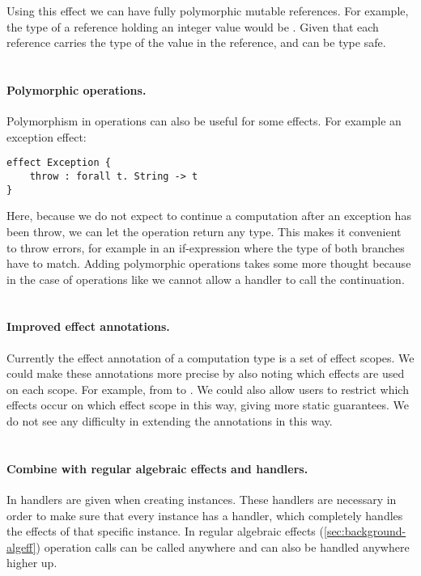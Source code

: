 Using this effect we can have fully polymorphic mutable references.
For example, the type of a reference holding an integer value would be .
Given that each reference carries the type of the value in the reference,  and  can be type safe.
\\\\
\paragraph{Polymorphic operations.}
Polymorphism in operations can also be useful for some effects.
For example an exception effect:
\begin{verbatim}
effect Exception {
	throw : forall t. String -> t
}
\end{verbatim}
Here, because we do not expect to continue a computation after an exception has been throw, we can let the  operation return any type.
This makes it convenient to throw errors, for example in an if-expression where the type of both branches have to match.
Adding polymorphic operations takes some more thought because in the case of operations like  we cannot allow a handler to call the continuation.
\\\\
\paragraph{Improved effect annotations.}
Currently the effect annotation of a computation type is a set of effect scopes.
We could make these annotations more precise by also noting which effects are used on each scope.
For example, from  to .
We could also allow users to restrict which effects occur on which effect scope in this way, giving more static guarantees.
We do not see any difficulty in extending the annotations in this way.
\\\\
\paragraph{Combine with regular algebraic effects and handlers.}
In \lang{} handlers are given when creating instances.
These handlers are necessary in order to make sure that every instance has a handler, which completely handles the effects of that specific instance.
In regular algebraic effects (\cref{sec:background-algeff}) operation calls can be called anywhere and can also be handled anywhere higher up.

